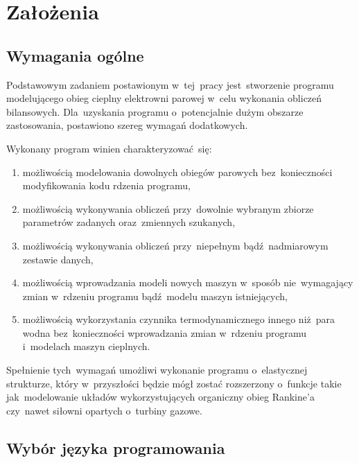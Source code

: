 \section{Założenia}

\subsection{Wymagania ogólne}

Podstawowym zadaniem postawionym w~tej~pracy jest~stworzenie programu
modelującego obieg cieplny elektrowni parowej w~celu wykonania obliczeń
bilansowych. Dla~uzyskania programu o~potencjalnie dużym obszarze
zastosowania, postawiono szereg wymagań dodatkowych.

Wykonany program winien charakteryzować~się:

\begin{enumerate}

	\item możliwością modelowania dowolnych obiegów parowych
	bez~konieczności modyfikowania kodu rdzenia programu,

	\item możliwością wykonywania obliczeń przy~dowolnie wybranym
	zbiorze parametrów zadanych oraz~zmiennych szukanych,

	\item możliwością wykonywania obliczeń przy~niepełnym
	bądź~nadmiarowym zestawie danych,

	\item możliwością wprowadzania modeli nowych maszyn w~sposób
	nie~wymagający zmian w~rdzeniu programu bądź~modelu maszyn
	istniejących,

	\item możliwością wykorzystania czynnika termodynamicznego innego
	niż~para wodna bez~konieczności wprowadzania zmian w~rdzeniu
	programu i~modelach maszyn cieplnych.

\end{enumerate}

Spełnienie tych~wymagań umożliwi wykonanie programu o~elastycznej
strukturze, który w~przyszłości będzie mógł zostać rozszerzony o~funkcje
takie jak~modelowanie układów wykorzystujących organiczny obieg
Rankine'a czy~nawet siłowni opartych o~turbiny gazowe.


\subsection{Wybór języka programowania}

